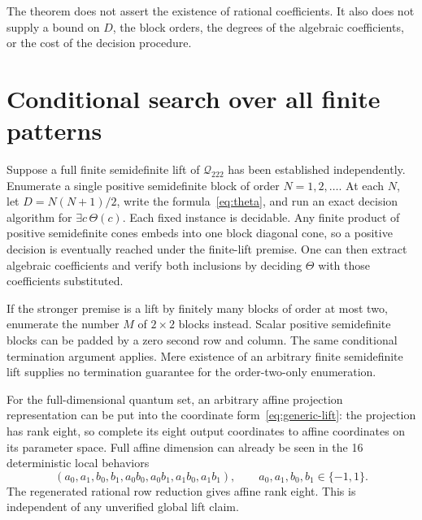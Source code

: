 \documentclass[11pt]{article}
\newcommand{\Q}{{\mathcal Q_{222}}}
\begin{document}
The theorem does not assert the existence of rational coefficients. It also does not supply a bound on $D$, the block orders, the degrees of the algebraic coefficients, or the cost of the decision procedure.

\section{Conditional search over all finite patterns}
Suppose a full finite semidefinite lift of $\Q$ has been established independently. Enumerate a single positive semidefinite block of order $N=1,2,\ldots$. At each $N$, let $D=N(N+1)/2$, write the formula~\eqref{eq:theta}, and run an exact decision algorithm for $\exists c\,\Theta(c)$. Each fixed instance is decidable. Any finite product of positive semidefinite cones embeds into one block diagonal cone, so a positive decision is eventually reached under the finite-lift premise. One can then extract algebraic coefficients and verify both inclusions by deciding $\Theta$ with those coefficients substituted.

If the stronger premise is a lift by finitely many blocks of order at most two, enumerate the number $M$ of $2\times2$ blocks instead. Scalar positive semidefinite blocks can be padded by a zero second row and column. The same conditional termination argument applies. Mere existence of an arbitrary finite semidefinite lift supplies no termination guarantee for the order-two-only enumeration.

For the full-dimensional quantum set, an arbitrary affine projection representation can be put into the coordinate form~\eqref{eq:generic-lift}: the projection has rank eight, so complete its eight output coordinates to affine coordinates on its parameter space. Full affine dimension can already be seen in the 16 deterministic local behaviors
\[
 (a_0,a_1,b_0,b_1,a_0b_0,a_0b_1,a_1b_0,a_1b_1),
 \qquad a_0,a_1,b_0,b_1\in\{-1,1\}.
\]
The regenerated rational row reduction gives affine rank eight. This is independent of any unverified global lift claim.
\end{document}
